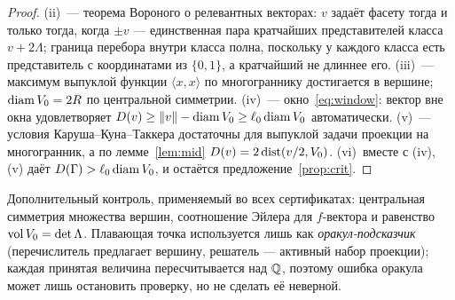 \begin{proof}
(ii)~--- теорема Вороного о релевантных векторах: $v$ задаёт фасету тогда и
только тогда, когда $\pm v$ --- единственная пара кратчайших представителей
класса $v+2\Lambda$; граница перебора внутри класса полна, поскольку у каждого
класса есть представитель с координатами из $\{0,1\}$, а кратчайший не длиннее
его. (iii)~--- максимум выпуклой функции $\langle x,x\rangle$ по многограннику
достигается в вершине; $\operatorname{diam} V_0=2R$ по центральной симметрии.
(iv)~--- окно~\eqref{eq:window}: вектор вне окна удовлетворяет
$D(v)\ge\|v\|-\operatorname{diam} V_0\ge\ell_0\operatorname{diam} V_0$ автоматически. (v)~--- условия
Каруша--Куна--Таккера достаточны для выпуклой задачи проекции на многогранник,
а по лемме~\ref{lem:mid} $D(v)=2\operatorname{dist}(v/2,V_0)$. (vi)~вместе с (iv), (v) даёт
$D(\Gamma)>\ell_0\operatorname{diam} V_0$, и остаётся предложение~\ref{prop:crit}.
\end{proof}

Дополнительный контроль, применяемый во всех сертификатах: центральная
симметрия множества вершин, соотношение Эйлера для $f$-вектора и равенство
$\operatorname{vol} V_0=\det\Lambda$. Плавающая точка используется лишь как
\emph{оракул-подсказчик} (перечислитель предлагает вершину, решатель --- активный
набор проекции); каждая принятая величина пересчитывается над $\mathbb{Q}$, поэтому
ошибка оракула может лишь остановить проверку, но не сделать её неверной.
